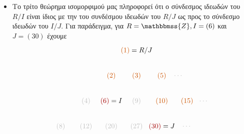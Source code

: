 \documentclass[12pt,a4paper,reqno]{amsart}
\makeatletter
\theoremstyle{definition}
\theoremstyle{remark}
\numberwithin{theorem}{section}
\numberwithin{exercise}{section}
\numberwithin{equation}{section}
\newcommand{\ZZ}{\mathbbmss{Z}}
\def\mathcolor#1#{\@mathcolor{#1}}
\def\@mathcolor#1#2#3{%
  \protect\leavevmode
  \begingroup
    \color#1{#2}#3%
  \endgroup
}
\makeatother
\begin{document}
\begin{itemize}
\[\begin{tikzpicture}
\begin{scope}[shift={(0,0)}]
        \draw[gray!50] (1)--(2);
        \draw[gray!50] (2) --(4);
        \draw[gray!50] (4)--(8);
        \draw[iceberg] (1)--(3);
        \draw[iceberg] (1)--(5);
        \draw[gray!50] (2) -- (6);
        \draw[gray!50] (2) --(10);
        \draw[gray!50] (3) -- (9);
        \draw[gray!50] (9) -- (27);
        \draw[iceberg] (3) -- (15);
        \draw[gray!50] (3) -- (6);
        \draw[gray!50] (5) -- (10);
        \draw[iceberg] (5) -- (15);
        \draw[applegreen] (4) -- (12); 
        \draw[applegreen] (4) -- (20);
        \draw[applegreen] (12) -- (60);
        \draw[applegreen] (20) -- (60);
        \draw[gray!50] (6) -- (12); 
        \draw[gray!50] (6) -- (30);
        \draw[gray!50] (10) -- (20); 
        \draw[gray!50] (10) -- (30);
        \draw[gray!50] (15) -- (30);
    \end{scope}
\end{tikzpicture}
\]

\item Το τρίτο θεώρημα ισομορφιμού μας πληροφορεί ότι ο σύνδεσμος ιδεωδών του $R/I$ είναι ίδιος με την  του συνδέσμου ιδεωδών του $R/J$ ως προς το σύνδεσμο ιδεωδών του $I/J$. Για παράδειγμα, για $R=\ZZ, I=(6)$ και $J=(30)$ έχουμε 
\[
\begin{tikzpicture}[scale=.85]
    \begin{scope}[shift={(0,0)}]
        \node[gray!50] (8) at (0,0) {$(8)$};
        \node[gray!50] (4) at (1.5,1.5) {$(4)$};
        \node (2) at (3,3) {$\mathcolor{burntorange}{(2)}$};
        \node (1) at (4.5,4.5) {$\mathcolor{burntorange}{(1)} = R/J$};

        \node[gray!50] (12) at (1.5,0) {$(12)$};
        \node (6) at (3,1.5) {$\mathcolor{darkcandyapplered}{(6)} = I$};
        \node (3) at (4.5,3) {$\mathcolor{burntorange}{(3)}$};

        \node[gray!50] (20) at (3,0) {$(20)$};
        \node[gray!50] (9) at (4.5,1.5) {$(9)$};

        \node[gray!50] (27) at (4.5,0) {$(27)$};

        \node (30) at (6,0) {$\mathcolor{darkcandyapplered}{(30)} = J$};
        \node (10) at (6,1.5) {$\mathcolor{burntorange}{(10)}$};
        \node (5) at (6,3) {$\mathcolor{burntorange}{(5)}$};  

        \node (15) at (7.5,1.5) {$\mathcolor{burntorange}{(15)}$};

        \node[gray!50] (dots1) at (7,3) {$\cdots$};
        \node[gray!50] (dots2) at (8.5,1.5) {$\cdots$};
        \node[gray!50] (dots3) at (7.5,0) {$\cdots$};


\end{scope}
\end{tikzpicture}\]
\end{itemize}
\end{document}
